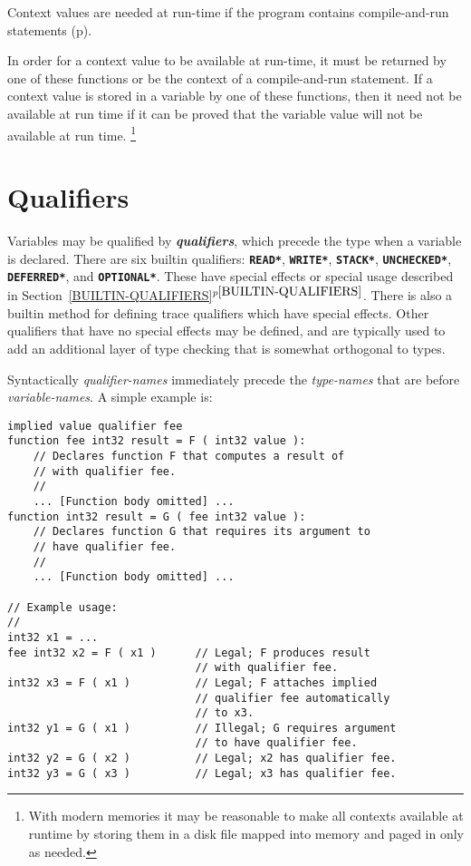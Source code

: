 \documentclass[12pt]{article}
\newcommand{\TT}[1]{{\tt \bfseries #1}}
\newcommand{\skey}[2]{{\bf \em #1#2}\index{#1}}
\newcommand{\itemref}[1]{\ref{#1}$^{p\pageref{#1}}$}
\newcommand{\pagref}[1]{p\pageref{#1}}
\newenvironment{indpar}[1][0.3in]%
	{\begin{list}{}%
		     {\setlength{\itemsep}{0in}%
		      \setlength{\topsep}{0in}%
		      \setlength{\parsep}{1ex}%
		      \setlength{\labelwidth}{#1}%
		      \setlength{\leftmargin}{#1}%
		      \addtolength{\leftmargin}{\labelsep}}%
	 \item}%
	{\end{list}}
\begin{document}
Context values are needed at run-time if the program contains
compile-and-run statements (\pagref{COMPILE-AND-RUN-ASSIGNMENT-STATEMENTS}).

In order for a context value to be available at run-time, it
must be returned by one of these functions or be the context of
a compile-and-run statement.
If a context value is stored in a variable by one of these functions,
then it need not be available at run time if it can be proved that the
variable value will not be available at run time.%
\footnote{With modern memories it may be reasonable
to make all contexts available at runtime by storing them
in a disk file mapped into memory and paged in only as needed.}

\section{Qualifiers}
\label{QUALIFIERS}

Variables may be qualified by \skey{qualifier}s, which precede the
type when a variable is declared.  There are six builtin qualifiers:
\TT{*READ*}, \TT{*WRITE*}, \TT{*STACK*}, \TT{*UNCHECKED*},
\TT{*DEFERRED*}, and \TT{*OPTIONAL*}.
These have special effects or special usage
described in Section~\itemref{BUILTIN-QUALIFIERS}.
There is also a builtin method for defining trace qualifiers which
have special effects.
Other qualifiers that have no special effects
may be defined, and are typically used to add an
additional layer of type checking that is somewhat orthogonal to
types.

Syntactically {\em qualifier-names} immediately precede the {\em type-names}
that are before {\em variable-names}.  A simple example is:
\begin{indpar}\begin{verbatim}
implied value qualifier fee
function fee int32 result = F ( int32 value ):
    // Declares function F that computes a result of
    // with qualifier fee.
    //
    ... [Function body omitted] ...
function int32 result = G ( fee int32 value ):
    // Declares function G that requires its argument to
    // have qualifier fee.
    //
    ... [Function body omitted] ...

// Example usage:
//
int32 x1 = ...
fee int32 x2 = F ( x1 )      // Legal; F produces result
                             // with qualifier fee.
int32 x3 = F ( x1 )          // Legal; F attaches implied
                             // qualifier fee automatically
                             // to x3.
int32 y1 = G ( x1 )          // Illegal; G requires argument
                             // to have qualifier fee.
int32 y2 = G ( x2 )          // Legal; x2 has qualifier fee.
int32 y3 = G ( x3 )          // Legal; x3 has qualifier fee.

\end{verbatim}\end{indpar}
\end{document}
